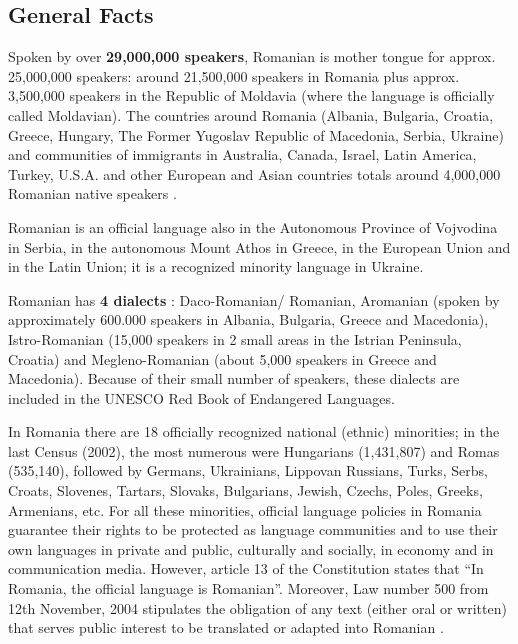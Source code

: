 \documentclass[]{../../metanetpaper}
\begin{document}
\begin{multicols}{2}

\subsection{General Facts}

Spoken by over \textbf{29,000,000 speakers}\cite{vintila}, Romanian is mother tongue for approx. 25,000,000 speakers: around 21,500,000 speakers in Romania \cite{stat1} plus approx. 3,500,000 speakers in the Republic of Moldavia \cite{stat2} (where the language is officially called Moldavian). The countries around Romania (Albania, Bulgaria, Croatia, Greece, Hungary, The Former Yugoslav Republic of Macedonia, Serbia, Ukraine) and communities of immigrants in Australia, Canada, Israel, Latin America, Turkey, U.S.A. and other European and Asian countries totals around 4,000,000 Romanian native speakers \cite{urlRom_diaspora}.

Romanian is an official language also in the Autonomous Province of Vojvodina in Serbia, in the autonomous Mount Athos in Greece, in the European Union and in the Latin Union; it is a recognized minority language in Ukraine.

Romanian has \textbf{4 dialects} \cite{sala}: Daco-Romanian/ Romanian, Aromanian (spoken by approximately 600.000 speakers in Albania, Bulgaria, Greece and Macedonia), Istro-Romanian (15,000 speakers in 2 small areas in the Istrian Peninsula, Croatia) and Megleno-Romanian (about 5,000 speakers in Greece and Macedonia). Because of their small number of speakers, these dialects are included in the UNESCO Red Book of Endangered Languages.

In Romania there are 18 officially recognized national (ethnic) minorities; in the last Census (2002), the most numerous were Hungarians (1,431,807) and Romas (535,140), followed by Germans, Ukrainians, Lippovan Russians, Turks, Serbs, Croats, Slovenes, Tartars, Slovaks, Bulgarians, Jewish, Czechs, Poles, Greeks, Armenians, etc. For all these minorities, official language policies in Romania guarantee their rights to be protected as language communities and to use their own languages in private and public, culturally and socially, in economy and in communication media. However, article 13 of the Constitution states that “In Romania, the official language is Romanian”. Moreover, Law number 500 from 12th November, 2004 stipulates the obligation of any text (either oral or written) that serves public interest to be translated or adapted into Romanian \cite{urlEFNIL}.


\end{multicols}
\end{document}
